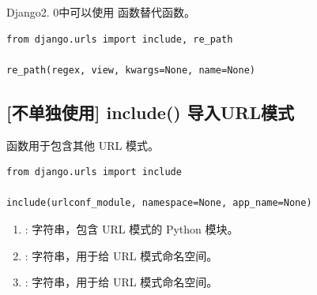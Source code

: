 Django2. 0中可以使用 函数替代函数。
\begin{lstlisting}[style=demostyle,numbers=none]
from django.urls import include, re_path

re_path(regex, view, kwargs=None, name=None)
\end{lstlisting}

\subsection{[不单独使用] include() 导入URL模式}
函数用于包含其他 URL 模式。
\begin{lstlisting}[style=demostyle,numbers=none]
from django.urls import include

include(urlconf_module, namespace=None, app_name=None)
\end{lstlisting}
\begin{enumerate}[label=\arabic*)]
  \item {}: 字符串，包含 URL 模式的 Python 模块。
  \item {}: 字符串，用于给 URL 模式命名空间。
  \item {}: 字符串，用于给 URL 模式命名空间。
\end{enumerate}

